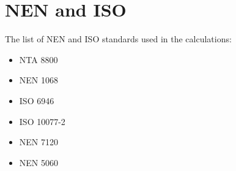 \section{NEN and ISO}

The list of NEN and ISO standards used in the calculations:

\begin{itemize}
    \item NTA 8800
    \item NEN 1068
    \item ISO 6946
    \item ISO 10077-2
    \item NEN 7120
    \item NEN 5060\cite{NEN5060}
\end{itemize}

\newpage